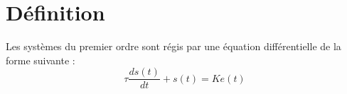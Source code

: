 \documentclass[10pt,fleqn]{article} %
\begin{document}


%
%
%
%
%
%
%
%
%
%
%
%
%


\section{Définition}

Les systèmes du premier ordre sont régis par une équation différentielle de la
forme suivante :
$$
\tau \dfrac{ds(t)}{dt}+s(t) = Ke(t)
$$
\end{document}
